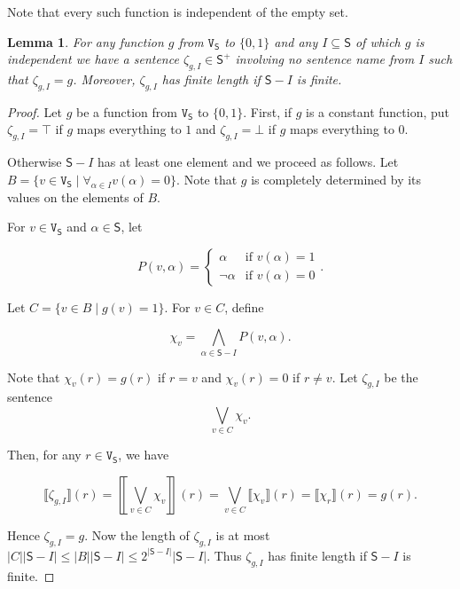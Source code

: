 \documentclass[12pt]{article}
\newtheorem{lem}[thm]{Lemma}
\theoremstyle{remark}
\def\S{\textsf{S}}
\def\V{\texttt{V}}
\begin{document}
Note that every such function is independent of the empty set.

\begin{lem}\label{LanguageIsComplete}
For any function $g$ from $\V_\S$ to $\{0, 1\}$ and any $I \subseteq \S$ of which $g$ is independent we have a sentence $\zeta_{g, I} \in \S^+$ involving no sentence name from $I$ such that $\zeta_{g, I} = g$. Moreover, $\zeta_{g, I}$ has finite length if $\S - I$ is finite.
\end{lem}

\begin{proof}
Let $g$ be a function from $\V_\S$ to  $\{0, 1\}$.  First, if $g$ is a constant function, put $\zeta_{g, I} = \top$ if $g$ maps everything to $1$ and $\zeta_{g, I} = \bot$ if $g$ maps everything to $0$.\newline

Otherwise $\S - I$ has at least one element and we proceed as follows.  Let $B = \{v \in \V_\S \mid \forall_{\alpha \in I} v(\alpha) = 0\}$. Note that $g$ is completely determined by its values on the elements of $B$. \newline

For $v \in \V_\S$ and $\alpha \in \S$, let 

\[P(v, \alpha) = \begin{cases}
\alpha & \text{if } v(\alpha) = 1 \\
\neg \alpha & \text{if } v(\alpha) = 0
\end{cases}.\]

Let $C = \{v \in B \mid g(v) = 1 \}$. For $v \in C$, define

\[\chi_v = \bigwedge_{\alpha \in \S - I} P(v, \alpha).\] 

Note that $\chi_v(r) = g(r)$ if $r = v$ and $\chi_v(r) = 0$ if $r \neq v$. Let $\zeta_{g, I}$ be the sentence
\[\bigvee_{v \in C} \chi_v.\]

Then, for any $r \in \V_\S$, we have 

\[\llbracket \zeta_{g, I} \rrbracket(r) = \left\llbracket\bigvee_{v \in C} \chi_v \right\rrbracket(r) = \bigvee_{v \in C} \llbracket \chi_v \rrbracket(r) = \llbracket \chi_r \rrbracket(r) = g(r).\]

Hence $\zeta_{g, I} = g$.  Now the length of  $\zeta_{g, I}$ is at most $|C||\S - I| \leq |B||\S - I| \leq 2^{|\S - I|}|\S - I|$. Thus $\zeta_{g, I}$ has finite length if  $\S - I$ is finite. 
\end{proof}
\end{document}
